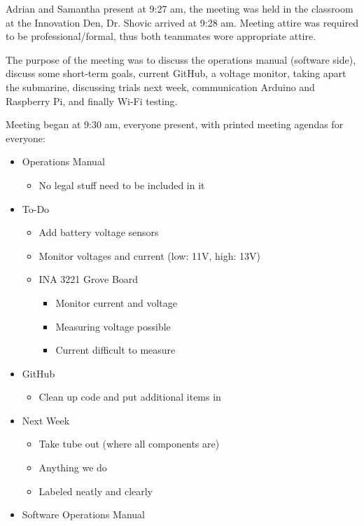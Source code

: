 \documentclass[12pt]{article}
\begin{document}
			\noindent
			Adrian and Samantha present at 9:27 am, the meeting was held in the classroom at the Innovation Den, Dr. Shovic arrived at 9:28 am. Meeting attire was required to be professional/formal, thus both teammates wore appropriate attire. 
			
			\noindent
			The purpose of the meeting was to discuss the operations manual (software side), discuss some short-term goals, current GitHub, a voltage monitor, taking apart the submarine, discussing trials next week, communication Arduino and Raspberry Pi, and finally Wi-Fi testing.
			
			\noindent
			Meeting began at 9:30 am, everyone present, with printed meeting agendas for everyone:
			
			\noindent
			\begin{itemize}
				\item Operations Manual
				\begin{itemize}
					\item No legal stuff need to be included in it
				\end{itemize}
				\item To-Do
				\begin{itemize}
					\item Add battery voltage sensors
					\item Monitor voltages and current (low: 11V, high: 13V)
					\item INA 3221 Grove Board
					\begin{itemize}
						\item Monitor current and voltage
						\item Measuring voltage possible
						\item Current difficult to measure
					\end{itemize}
				\end{itemize}
				\item GitHub
				\begin{itemize}
					\item Clean up code and put additional items in
				\end{itemize}
				\item Next Week
				\begin{itemize}
					\item Take tube out (where all components are)
					\item Anything we do
					\item Labeled neatly and clearly
				\end{itemize}
				\item Software Operations Manual

\end{itemize}
\end{document}
